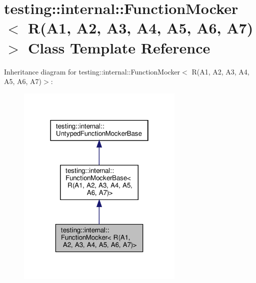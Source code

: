 \hypertarget{classtesting_1_1internal_1_1_function_mocker_3_01_r_07_a1_00_01_a2_00_01_a3_00_01_a4_00_01_a5_00_01_a6_00_01_a7_08_4}{}\section{testing\+:\+:internal\+:\+:Function\+Mocker$<$ R(A1, A2, A3, A4, A5, A6, A7)$>$ Class Template Reference}
\label{classtesting_1_1internal_1_1_function_mocker_3_01_r_07_a1_00_01_a2_00_01_a3_00_01_a4_00_01_a5_00_01_a6_00_01_a7_08_4}


Inheritance diagram for testing\+:\+:internal\+:\+:Function\+Mocker$<$ R(A1, A2, A3, A4, A5, A6, A7)$>$\+:
\nopagebreak
\begin{figure}[H]
\begin{center}
\leavevmode
\includegraphics[width=226pt]{classtesting_1_1internal_1_1_function_mocker_3_01_r_07_a1_00_01_a2_00_01_a3_00_01_a4_00_01_a5_008d5372eb9fbc6c0c339fc18cce8f7265}
\end{center}
\end{figure}


